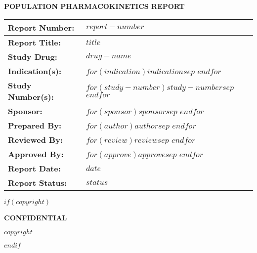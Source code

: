 \thispagestyle{empty}
\vskip2cm
{\centerline{\textbf{POPULATION PHARMACOKINETICS REPORT}}}
\vskip1cm
\begin{table}[!h]
      \setlength{\tabcolsep}{5pt}
      \renewcommand{\arraystretch}{1.5}
      \begin{tabularx}{\textwidth}{|p{}|X|}
            \hline
            \textbf{Report Number:} & $report-number$\\
            \hline
            \textbf{Report Title:} & $title$ \\
            \hline
            \textbf{Study Drug:} &  $drug-name$\\
            \hline
            \textbf{Indication(s):} & $for(indication)$$indication$$sep$ \newline $endfor$\\
            \hline
            \textbf{Study Number(s):} & $for(study-number)$$study-number$$sep$ \newline $endfor$\\
            \hline
            \textbf{Sponsor:} & $for(sponsor)$$sponsor$$sep$ \newline $endfor$\\
            \hline
            \textbf{Prepared By:} & $for(author)$$author$$sep$ \newline $endfor$\\
            \hline
            \textbf{Reviewed By:} & $for(review)$$review$$sep$ \newline $endfor$ \\
            \hline
            \textbf{Approved By:} & $for(approve)$$approve$$sep$ \newline $endfor$\\
            \hline
            \textbf{Report Date:} & $date$\\
            \hline
            \textbf{Report Status:}  & $status$\\
            \hline
      \end{tabularx}
\end{table}
\vskip0.5cm
$if(copyright)$
\begin{center}
{\textbf{CONFIDENTIAL}}
\begin{mdframed}
    {\normalsize $copyright$}
\end{mdframed}
\end{center}
$endif$